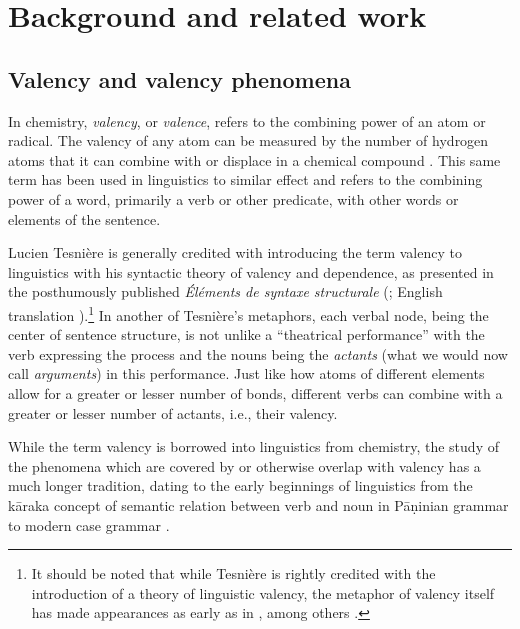\section{Background and related work}\label{sec:background}

\subsection{Valency and valency phenomena}\label{subsec:valency}


In chemistry, \textit{valency}, or \textit{valence}, refers to the combining power of an atom or radical. The valency of any atom can be measured by the number of hydrogen atoms that it can combine with or displace in a chemical compound \citep{law2020a}. This same term has been used in linguistics to similar effect and refers to the combining power of a word, primarily a verb or other predicate, with other words or elements of the sentence. 

Lucien Tesnière is generally credited with introducing the term valency to linguistics with his syntactic theory of valency and dependence, as presented in the posthumously published \textit{Éléments de syntaxe structurale} (\cite*{tesniere1959}; English translation \cite*{tesniere2015}).\footnote{
    It should be noted that while Tesnière is rightly credited with the introduction of a theory of linguistic valency, the metaphor of valency itself has made appearances as early as in \citet{peirce1897}, among others \citep{przepiorkowski2018}.
}
In another of Tesnière's metaphors, each verbal node, being the center of sentence structure, is not unlike a ``theatrical performance'' with the verb expressing the process and the nouns being the \textit{actants} (what we would now call \textit{arguments}) in this performance. Just like how atoms of different elements allow for a greater or lesser number of bonds, different verbs can combine with a greater or lesser number of actants, i.e., their valency.

While the term valency is borrowed into linguistics from chemistry, the study of the phenomena which are covered by or otherwise overlap with valency has a much longer tradition, dating to the early beginnings of linguistics from the kāraka concept of semantic relation between verb and noun \citep{ganeri2011a} in Pāṇinian grammar to modern case grammar \citep{fillmore1968}. 

